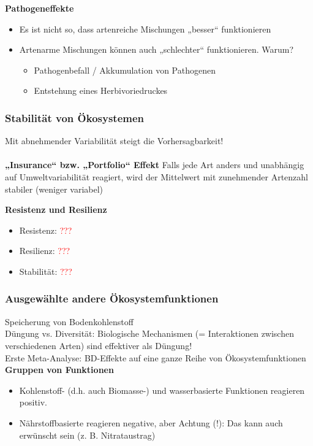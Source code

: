 \textbf{Pathogeneffekte}
\begin{itemize}
	\item Es ist nicht so, dass artenreiche Mischungen „besser“ funktionieren
	\item Artenarme Mischungen können auch „schlechter“ funktionieren. Warum?
	\begin{itemize}
		\item Pathogenbefall / Akkumulation von Pathogenen
		\item Entstehung eines Herbivoriedruckes
	\end{itemize}
\end{itemize}

\subsubsection{Stabilität von Ökosystemen}
Mit abnehmender Variabilität steigt die Vorhersagbarkeit!
\\\\
\textbf{„Insurance“ bzw. „Portfolio“ Effekt}
Falls jede Art anders und unabhängig auf Umweltvariabilität reagiert, wird der Mittelwert mit zunehmender Artenzahl stabiler (weniger variabel)

\textbf{Resistenz und Resilienz}
\begin{itemize}
	\item Resistenz: \textcolor{red}{???}
	\item Resilienz: \textcolor{red}{???}
	\item Stabilität: \textcolor{red}{???}
\end{itemize}

\subsubsection{Ausgewählte andere Ökosystemfunktionen}
Speicherung von Bodenkohlenstoff\\
Düngung vs. Diversität: Biologische Mechanismen (= Interaktionen zwischen verschiedenen Arten) sind effektiver als Düngung!\\

Erste Meta-Analyse: BD-Effekte auf eine ganze Reihe von Ökosystemfunktionen
\\
\textbf{Gruppen von Funktionen}\\
\begin{itemize}
	\item Kohlenstoff- (d.h. auch Biomasse-) und wasserbasierte Funktionen reagieren positiv.
	\item Nährstoffbasierte reagieren negative, aber Achtung (!): Das kann auch erwünscht sein (z. B. Nitrataustrag)
\end{itemize}

